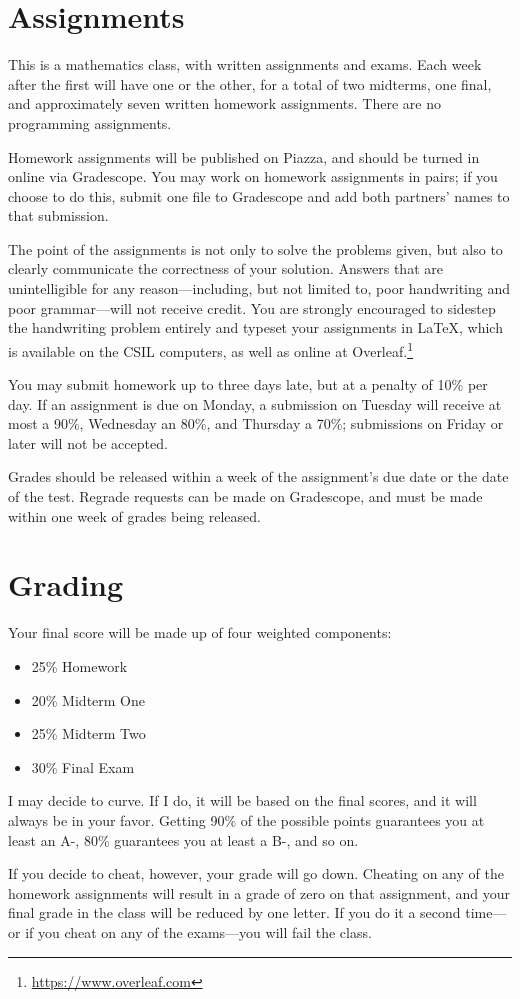 \documentclass{article}
\begin{document}
\section{Assignments}

This is a mathematics class, with written assignments and exams.
Each week after the first will have one or the other, for a total of two midterms, one final, and approximately seven written homework assignments.
There are no programming assignments.

Homework assignments will be published on Piazza, and should be turned in online via Gradescope.
You may work on homework assignments in pairs; if you choose to do this, submit one file to Gradescope and add both partners' names to that submission.

The point of the assignments is not only to solve the problems given, but also to clearly communicate the correctness of your solution.
Answers that are unintelligible for any reason---including, but not limited to, poor handwriting and poor grammar---will not receive credit.
You are strongly encouraged to sidestep the handwriting problem entirely and typeset your assignments in \LaTeX{}, which is available on the CSIL computers, as well as online at Overleaf.\footnote{\url{https://www.overleaf.com}}

You may submit homework up to three days late, but at a penalty of 10\% per day.
If an assignment is due on Monday, a submission on Tuesday will receive at most a 90\%, Wednesday an 80\%, and Thursday a 70\%; submissions on Friday or later will not be accepted.

Grades should be released within a week of the assignment's due date or the date of the test.
Regrade requests can be made on Gradescope, and must be made within one week of grades being released.


\section{Grading}

Your final score will be made up of four weighted components:

\begin{itemize}
    \setlength\itemsep{0em}
    \item 25\% Homework
    \item 20\% Midterm One
    \item 25\% Midterm Two
    \item 30\% Final Exam
\end{itemize}

I may decide to curve.
If I do, it will be based on the final scores, and it will always be in your favor.
Getting 90\% of the possible points guarantees you at least an A-, 80\% guarantees you at least a B-, and so on.

If you decide to cheat, however, your grade will go down.
Cheating on any of the homework assignments will result in a grade of zero on that assignment, and your final grade in the class will be reduced by one letter.
If you do it a second time---or if you cheat on any of the exams---you will fail the class.
\end{document}
